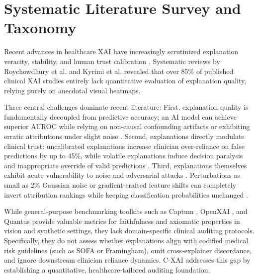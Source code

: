 \documentclass[3p,times,procedia]{elsarticle}
\theoremstyle{definition}
\begin{document}
\section{Systematic Literature Survey and Taxonomy}

Recent advances in healthcare XAI have increasingly scrutinized explanation veracity, stability, and human trust calibration \cite{muhammad2024unveiling,ali2023enlightening,jung2023essential,mienye2024survey,zhang2026comprehensive}. Systematic reviews by Roychowdhury et al. \cite{roychowdhury2025evaluation} and Kyrimi et al. \cite{kyrimi2025explanation} revealed that over 85\% of published clinical XAI studies entirely lack quantitative evaluation of explanation quality, relying purely on anecdotal visual heatmaps.

Three central challenges dominate recent literature:
First, explanation quality is fundamentally decoupled from predictive accuracy; an AI model can achieve superior AUROC while relying on non-causal confounding artifacts or exhibiting erratic attributions under slight noise \cite{jin2023guidelines,roychowdhury2025evaluation,repetto2026robustness}.
Second, explanations directly modulate clinical trust: uncalibrated explanations increase clinician over-reliance on false predictions by up to 45\%, while volatile explanations induce decision paralysis and inappropriate override of valid predictions \cite{bussone2015trust,jacobs2021designing,naiseh2023trust,rosenbacke2024trust,rezaeian2025impact,nicolson2025human}.
Third, explanations themselves exhibit acute vulnerability to noise and adversarial attacks \cite{baniecki2024adversarial,repetto2026robustness}. Perturbations as small as 2\% Gaussian noise or gradient-crafted feature shifts can completely invert attribution rankings while keeping classification probabilities unchanged \cite{sun2023patch,mitrut2024clarity}.

While general-purpose benchmarking toolkits such as Captum \cite{kokhlikyan2020captum}, OpenXAI \cite{agarwal2022openxai}, and Quantus \cite{hedstrom2023quantus} provide valuable metrics for faithfulness and axiomatic properties in vision and synthetic settings, they lack domain-specific clinical auditing protocols. Specifically, they do not assess whether explanations align with codified medical risk guidelines (such as SOFA or Framingham), omit cross-explainer discordance, and ignore downstream clinician reliance dynamics. C-XAI addresses this gap by establishing a quantitative, healthcare-tailored auditing foundation.
\end{document}
